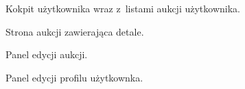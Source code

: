 \begin{figure}[h]
\centering
{}
\caption{Kokpit użytkownika wraz z~listami aukcji użytkownika.}
\end{figure}

\begin{figure}[h]
\centering
{}
\caption{Strona aukcji zawierająca detale.}
\end{figure}

\begin{figure}[h]
\centering
{}
\caption{Panel edycji aukcji.}
\end{figure}

\begin{figure}[h]
\centering
{}
\caption{Panel edycji profilu użytkownka.}
\end{figure}

